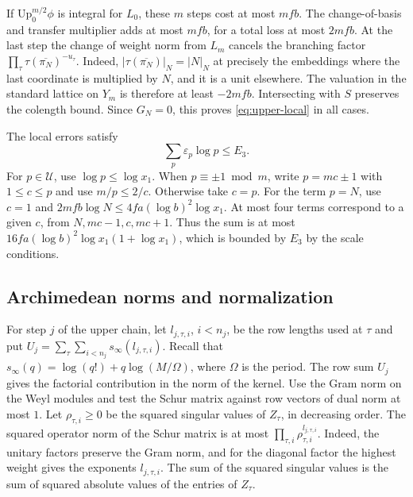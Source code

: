 If \(\mathrm{Up}_0^{m/2}\phi\) is integral for \(L_0\), these \(m\)
steps cost at most \(mfb\). The change-of-basis and transfer multiplier
adds at most \(mfb\), for a total loss at most \(2mfb\).
At the last step the change of weight norm from \(L_m\) cancels
the branching factor \(\prod_\tau\tau(\overline{\pi_N})^{-u_\tau}\).
Indeed, \(\lvert\tau(\overline{\pi_N})\rvert_N=\lvert N\rvert_N\)
at precisely the embeddings where the last coordinate is multiplied
by \(N\), and it is a unit elsewhere.
The valuation in the standard lattice on \(Y_m\) is therefore
at least \(-2mfb\).
Intersecting with \(S\) preserves the colength bound.
Since \(G_N=0\), this proves \eqref{eq:upper-local} in all cases.

The local errors satisfy
\begin{equation}\label{eq:upper-error-sum}
  \sum_p \varepsilon_p\log p\le E_3.
\end{equation}
For \(p\in\mathcal U\), use \(\log p\le\log x_1\).
When \(p\equiv\pm1\bmod m\), write \(p=mc\pm1\) with \(1\le c\le p\)
and use \(m/p\le2/c\). Otherwise take \(c=p\).
For the term \(p=N\), use \(c=1\) and
\(2mfb\log N\le4fa(\log b)^2\log x_1\).
At most four terms correspond to a given \(c\), from
\(N,mc-1,c,mc+1\). Thus the sum is at most
\(16fa(\log b)^2\log x_1(1+\log x_1)\), which is bounded by \(E_3\)
by the scale conditions.

\subsection{Archimedean norms and normalization}

For step \(j\) of the upper chain, let \(l_{j,\tau,i}\), \(i<n_j\),
be the row lengths used at \(\tau\) and put
\(U_j=\sum_\tau\sum_{i<n_j}s_\infty(l_{j,\tau,i})\).
Recall that \(s_\infty(q)=\log(q!)+q\log(M/\Omega)\), where \(\Omega\)
is the period. The row sum \(U_j\) gives the factorial contribution
in the norm of the kernel.
Use the Gram norm on the Weyl modules and test the Schur matrix
against row vectors of dual norm at most \(1\).
Let \(\rho_{\tau,i}\ge0\) be the squared singular values of
\(Z_\tau\), in decreasing order. The squared operator norm of the Schur matrix is
at most \(\prod_{\tau,i}\rho_{\tau,i}^{l_{j,\tau,i}}\).
Indeed, the unitary factors preserve the Gram norm, and for the
diagonal factor the highest weight gives the exponents \(l_{j,\tau,i}\).
The sum of the squared singular values is the sum of squared
absolute values of the entries of \(Z_\tau\).

